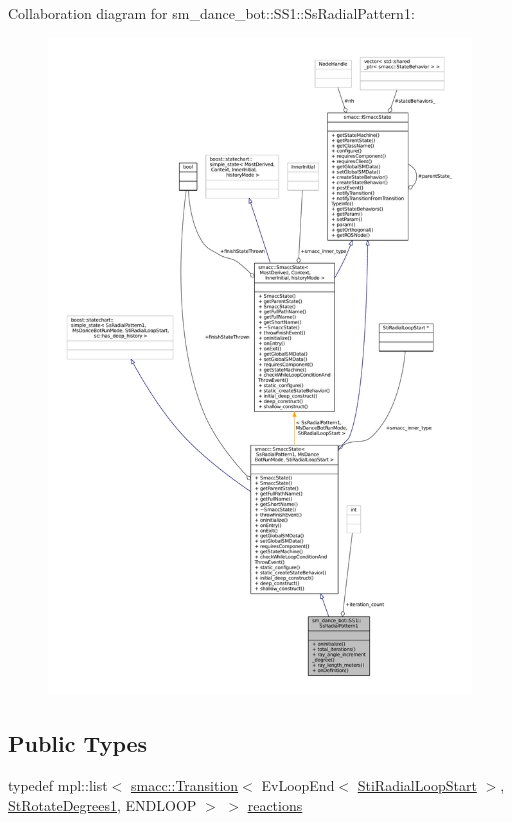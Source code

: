 Collaboration diagram for sm\+\_\+dance\+\_\+bot\+:\+:S\+S1\+:\+:Ss\+Radial\+Pattern1\+:
\nopagebreak
\begin{figure}[H]
\begin{center}
\leavevmode
\includegraphics[width=350pt]{structsm__dance__bot_1_1SS1_1_1SsRadialPattern1__coll__graph}
\end{center}
\end{figure}
\subsection*{Public Types}
\begin{DoxyCompactItemize}
\item 
typedef mpl\+::list$<$ \hyperlink{classsmacc_1_1Transition}{smacc\+::\+Transition}$<$ Ev\+Loop\+End$<$ \hyperlink{structsm__dance__bot_1_1radial__motion__states_1_1StiRadialLoopStart}{Sti\+Radial\+Loop\+Start} $>$, \hyperlink{structsm__dance__bot_1_1StRotateDegrees1}{St\+Rotate\+Degrees1}, E\+N\+D\+L\+O\+OP $>$ $>$ \hyperlink{structsm__dance__bot_1_1SS1_1_1SsRadialPattern1_a65efd05b8625dd33fcc05921c8383baf}{reactions}
\end{DoxyCompactItemize}
